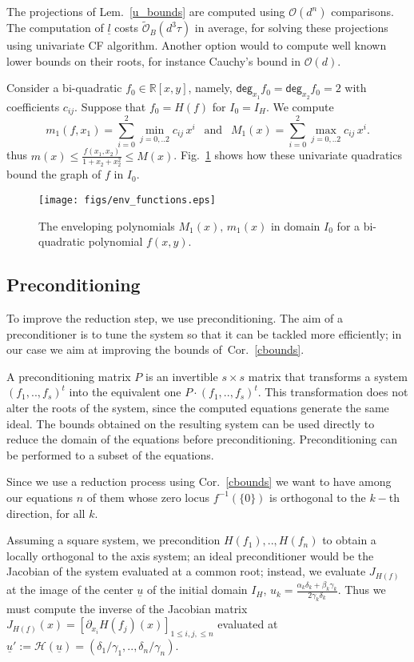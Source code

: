 \documentclass{sig-alternate}
\newcommand{\dott}{{..}}
\def\RR{\mathbb{R}}
\newcommand{\OO}{\ensuremath{\mathcal{O}}\xspace}
\newcommand{\sOB}{\ensuremath{\widetilde{\mathcal{O}}_B}\xspace}
\newcommand{\uvec}[1]{\underline{#1}}
\newcommand{\dg}{\ensuremath{\mathsf{deg}}\xspace}
\begin{document}
The projections of Lem.~\ref{u_bounds} are computed using $\OO(d^n)$ comparisons. The computation of $\uvec l$ costs $\sOB(d^3\tau)$ in average, for solving these projections using univariate CF algorithm. Another option would to compute well known lower bounds on their roots, for instance Cauchy's bound in $\OO(d)$.
 
 Consider a bi-quadratic $f_0\in\RR[x,y]$, namely, $\dg_{x_1} f_0= \dg_{x_2} f_0= 2$ with coefficients $c_{ij}$. Suppose that $f_0=H(f)$ for $I_0=I_H$. We compute
$$ m_1(f,x_1)= \sum_{i=0}^{2} \min_{j=0,\dott 2} c_{ij} \, x^i
\ \ \text{ and }\ \  
M_1(x)= \sum_{i=0}^{2} \max_{j=0,\dott 2}  c_{ij} \, x^i .$$
thus $ m(x) \leq \frac{f(x_1,x_2)}{1+x_2+x_2^{2}} \leq M(x) $. Fig.~\ref{fig:env} shows how these univariate quadratics bound the graph of $f$ in $I_0$.
\begin{figure}[h]
  \centering
  \texttt{[image: figs/env\_functions.eps]}
  \caption{The enveloping polynomials $M_1(x),\, m_1(x)$ in domain $I_0$ for a bi-quadratic polynomial $f(x,y)$.}
  \label{fig:env}
\end{figure}

\subsection{Preconditioning}

To improve the reduction step, we use preconditioning. 
The aim of a preconditioner is to tune the system so that it can be
tackled more efficiently; in our case we aim at improving the bounds
of~Cor.~\ref{cbounds}.

A preconditioning matrix $P$ is an invertible $s\times s$ matrix that
transforms a system $(f_1,\dott,f_s)^t$ into the equivalent one
$P\cdot(f_1,\dott,f_s)^t$. 
This transformation does not alter the roots of the system, since the
computed equations generate the same ideal. The bounds obtained on the
resulting system can be used directly to reduce the domain of the
equations before preconditioning.
Preconditioning can be performed to a subset of the equations.

Since we use a reduction process using Cor.~\ref{cbounds} we
want to have among our equations $n$ of them whose zero locus
$f^{-1}(\{0\})$ is orthogonal to the $k-$th direction, for all
$k$.

Assuming a square system, we precondition $H(f_1),\dott,H(f_n)$ to
obtain a locally orthogonal to the axis system; an ideal
preconditioner would be the Jacobian of the system evaluated at a
common root; instead, we evaluate $J_{H(f)}$ at the image of the
center $\uvec u$ of the initial domain $I_H$,
$u_k=\frac{\alpha_k\delta_k+\beta_k\gamma_k}{2\gamma_k\delta_k
}$. Thus we must compute the inverse of the Jacobian matrix
$J_{H(\uvec f)}(x) = [\partial_{x_i}H(f_j)(x)]_{1\leq i,j,\leq n}$ evaluated
at $ \uvec u' := \mathcal H(\uvec u)= (\delta_1/\gamma_1,\dott,
\delta_n/\gamma_n)$.
\end{document}
